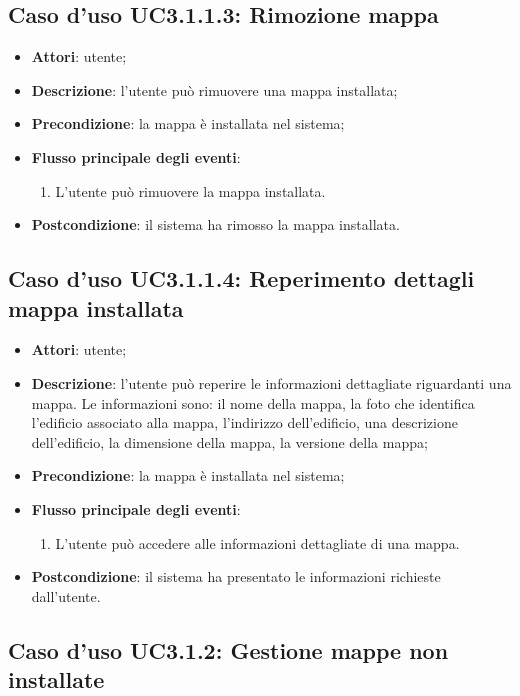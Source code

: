 \documentclass[../AnalisiDeiRequisiti.tex]{subfiles}
\begin{document}
\subsection{Caso d'uso UC3.1.1.3: Rimozione mappa}
\begin{itemize}
	\item \textbf{Attori}: utente;
	\item \textbf{Descrizione}: l'utente può rimuovere una mappa installata; 
	\item \textbf{Precondizione}: la mappa è installata nel sistema;
	
	\item \textbf{Flusso principale degli eventi}:
	\begin{enumerate}
		\item L'utente può rimuovere la mappa installata.
		
	\end{enumerate}
	\item \textbf{Postcondizione}: il sistema ha rimosso la mappa installata.
\end{itemize}
\hypertarget{UC3.1.1.4}{}
\subsection{Caso d'uso UC3.1.1.4: Reperimento dettagli mappa installata}
\begin{itemize}
	\item \textbf{Attori}: utente;
	\item \textbf{Descrizione}: l'utente può reperire le informazioni dettagliate riguardanti una mappa. Le informazioni sono: il nome della mappa, la foto che identifica l'edificio associato alla mappa, l'indirizzo dell'edificio, una descrizione dell'edificio, la dimensione della mappa, la versione della mappa; 
	\item \textbf{Precondizione}: la mappa è installata nel sistema;
	
	\item \textbf{Flusso principale degli eventi}:
	\begin{enumerate}
		\item L'utente può accedere alle informazioni dettagliate di una mappa.
		
	\end{enumerate}
	\item \textbf{Postcondizione}: il sistema ha presentato le informazioni richieste dall'utente.
\end{itemize}
\hypertarget{UC3.1.2}{}
\subsection{Caso d'uso UC3.1.2: Gestione mappe non installate}
\end{document}
